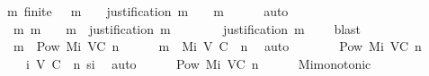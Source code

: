 \begin{isabellebody}
{\isachardoublequoteopen}{\isasymAnd}m{\isacharprime}{\isachardot}\ finite\ {\isasymsigma}\ {\isasymand}\ m{\isacharprime}\ {\isasymin}\ {\isasymsigma}\ {\isasymLongrightarrow}\ justification\ m{\isacharprime}\ {\isasymsubseteq}\ {\isasymsigma}\ {\isasymunion}\ {\isacharbraceleft}m{\isacharbraceright}{\isachardoublequoteclose}\isanewline
\ \ \ \ \isamarkupfalse%
\ auto\isanewline
\ \ \isamarkupfalse%
\ \isamarkupfalse%
\ {\isachardoublequoteopen}{\isasymAnd}m{\isacharprime}{\isachardot}\ m{\isacharprime}\ {\isasymin}\ {\isasymsigma}\ {\isasymunion}\ {\isacharbraceleft}m{\isacharbraceright}\ {\isasymLongrightarrow}\ justification\ m\ {\isasymsubseteq}\ {\isasymsigma}{\isachardoublequoteclose}\isanewline
\ \ \ \ \isamarkupfalse%
\ {\isacartoucheopen}justification\ m\ {\isasymsubseteq}\ {\isasymsigma}{\isacartoucheclose}\ \isamarkupfalse%
\ blast\isanewline
\isanewline
\ \ \isamarkupfalse%
\ {\isachardoublequoteopen}{\isacharbraceleft}m{\isacharbraceright}\ {\isasymin}\ Pow\ {\isacharparenleft}M{\isacharunderscore}i\ {\isacharparenleft}V{\isacharcomma}C{\isacharcomma}{\isasymepsilon}{\isacharparenright}\ n{\isacharparenright}{\isachardoublequoteclose}\isanewline
\ \ \ \ \isamarkupfalse%
\ {\isacartoucheopen}m\ {\isasymin}\ M{\isacharunderscore}i\ {\isacharparenleft}V{\isacharcomma}\ C{\isacharcomma}\ {\isasymepsilon}{\isacharparenright}\ n{\isacartoucheclose}\ \isamarkupfalse%
\ auto\isanewline
\ \ \isamarkupfalse%
\ \isamarkupfalse%
\ {\isachardoublequoteopen}{\isasymsigma}\ {\isasymin}\ Pow\ {\isacharparenleft}M{\isacharunderscore}i\ {\isacharparenleft}V{\isacharcomma}C{\isacharcomma}{\isasymepsilon}{\isacharparenright}\ {\isacharparenleft}n{\isacharminus}{}{\isacharparenright}{\isacharparenright}{\isachardoublequoteclose}\isanewline
\ \ \ \ \isamarkupfalse%
\ {\isacartoucheopen}{\isasymsigma}\ {\isasymin}\ {\isasymSigma}{\isacharunderscore}i\ {\isacharparenleft}V{\isacharcomma}\ C{\isacharcomma}\ {\isasymepsilon}{\isacharparenright}\ n{\isacartoucheclose}\ si\ \isamarkupfalse%
\ auto\isanewline
\ \ \isamarkupfalse%
\ {\isachardoublequoteopen}{\isasymsigma}\ {\isasymin}\ Pow\ {\isacharparenleft}M{\isacharunderscore}i\ {\isacharparenleft}V{\isacharcomma}C{\isacharcomma}{\isasymepsilon}{\isacharparenright}\ n{\isacharparenright}{\isachardoublequoteclose}\isanewline
\ \ \ \ \isamarkupfalse%
\ Mi{\isacharunderscore}monotonic\isanewline

\end{isabellebody}
